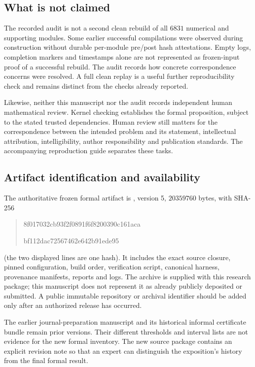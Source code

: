 \subsection{What is not claimed}
The recorded audit is not a second clean rebuild of all $6831$ numerical and supporting modules. Some earlier successful compilations were observed during construction without durable per-module pre/post hash attestations. Empty logs, completion markers and timestamps alone are not represented as frozen-input proof of a successful rebuild. The audit records how concrete correspondence concerns were resolved. A full clean replay is a useful further reproducibility check and remains distinct from the checks already reported.

Likewise, neither this manuscript nor the audit records independent human mathematical review. Kernel checking establishes the formal proposition, subject to the stated trusted dependencies. Human review still matters for the correspondence between the intended problem and its statement, intellectual attribution, intelligibility, author responsibility and publication standards. The accompanying reproduction guide separates these tasks.

\subsection{Artifact identification and availability}
The authoritative frozen formal artifact is
, version 5, $20359760$ bytes, with SHA-256
\begin{quote}\small\ttfamily
8f017032cb93f2f0891f6f8200390c161aca\par
bf112dac72567462e642b91ede95
\end{quote}
(the two displayed lines are one hash). It includes the exact source closure, pinned configuration, build order, verification script, canonical harness, provenance manifests, reports and logs. The archive is supplied with this research package; this manuscript does not represent it as already publicly deposited or submitted. A public immutable repository or archival identifier should be added only after an authorized release has occurred.

The earlier journal-preparation manuscript and its historical informal certificate bundle remain prior versions. Their different thresholds and interval lists are not evidence for the new formal inventory. The new source package contains an explicit revision note so that an expert can distinguish the exposition's history from the final formal result.

